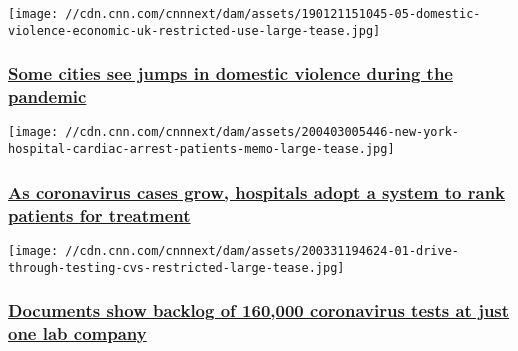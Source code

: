 \href{/2020/04/04/us/domestic-violence-coronavirus-calls-cases-increase-invs/index.html}{}

\texttt{[image: //cdn.cnn.com/cnnnext/dam/assets/190121151045-05-domestic-violence-economic-uk-restricted-use-large-tease.jpg]}

\hypertarget{some-cities-see-jumps-in-domestic-violence-during-the-pandemic}{%
\subsubsection{\texorpdfstring{\href{/2020/04/04/us/domestic-violence-coronavirus-calls-cases-increase-invs/index.html}{Some
cities see jumps in domestic violence during the
pandemic}}{Some cities see jumps in domestic violence during the pandemic}}\label{some-cities-see-jumps-in-domestic-violence-during-the-pandemic}}

\href{/2020/04/03/health/coronavirus-hospital-ethics-ventilators-invs/index.html}{}

\texttt{[image: //cdn.cnn.com/cnnnext/dam/assets/200403005446-new-york-hospital-cardiac-arrest-patients-memo-large-tease.jpg]}

\hypertarget{as-coronavirus-cases-grow-hospitals-adopt-a-system-to-rank-patients-for-treatment}{%
\subsubsection{\texorpdfstring{\href{/2020/04/03/health/coronavirus-hospital-ethics-ventilators-invs/index.html}{As
coronavirus cases grow, hospitals adopt a system to rank patients for
treatment}}{As coronavirus cases grow, hospitals adopt a system to rank patients for treatment}}\label{as-coronavirus-cases-grow-hospitals-adopt-a-system-to-rank-patients-for-treatment}}

\href{/2020/04/01/politics/testing-backlog-coronavirus-quest-invs/index.html}{}

\texttt{[image: //cdn.cnn.com/cnnnext/dam/assets/200331194624-01-drive-through-testing-cvs-restricted-large-tease.jpg]}

\hypertarget{documents-show-backlog-of-160000-coronavirus-tests-at-just-one-lab-company}{%
\subsubsection{\texorpdfstring{\href{/2020/04/01/politics/testing-backlog-coronavirus-quest-invs/index.html}{Documents
show backlog of 160,000 coronavirus tests at just one lab
company}}{Documents show backlog of 160,000 coronavirus tests at just one lab company}}\label{documents-show-backlog-of-160000-coronavirus-tests-at-just-one-lab-company}}

